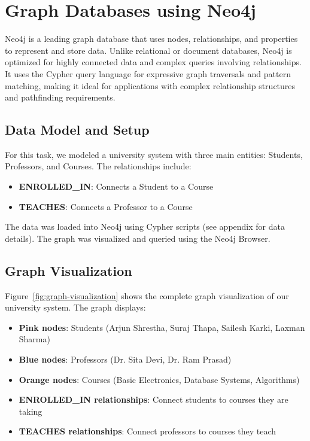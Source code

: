 \chapter{Graph Databases using Neo4j}

Neo4j is a leading graph database that uses nodes, relationships, and properties to represent and store data. Unlike relational or document databases, Neo4j is optimized for highly connected data and complex queries involving relationships. It uses the Cypher query language for expressive graph traversals and pattern matching, making it ideal for applications with complex relationship structures and pathfinding requirements.

\section{Data Model and Setup}
For this task, we modeled a university system with three main entities: Students, Professors, and Courses. The relationships include:
\begin{itemize}
  \item \textbf{ENROLLED\_IN}: Connects a Student to a Course
  \item \textbf{TEACHES}: Connects a Professor to a Course
\end{itemize}

The data was loaded into Neo4j using Cypher scripts (see appendix for data details). The graph was visualized and queried using the Neo4j Browser.

\section{Graph Visualization}
Figure~\ref{fig:graph-visualization} shows the complete graph visualization of our university system. The graph displays:
\begin{itemize}
  \item \textbf{Pink nodes}: Students (Arjun Shrestha, Suraj Thapa, Sailesh Karki, Laxman Sharma)
  \item \textbf{Blue nodes}: Professors (Dr. Sita Devi, Dr. Ram Prasad)
  \item \textbf{Orange nodes}: Courses (Basic Electronics, Database Systems, Algorithms)
  \item \textbf{ENROLLED\_IN relationships}: Connect students to courses they are taking
  \item \textbf{TEACHES relationships}: Connect professors to courses they teach
\end{itemize}

